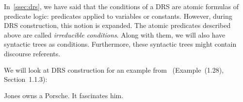\vspace{6mm}


\vspace{6mm}

In~\ref{ssec:drs}, we have said that the conditions of a DRS are atomic
formulas of predicate logic: predicates applied to variables or
constants. However, during DRS construction, this notion is expanded. The
atomic predicates described above are called \emph{irreducible
  conditions}. Along with them, we will also have syntactic trees as
conditions. Furthermore, these syntactic trees might contain discourse
referents.

We will look at DRS construction for an example
from~\cite{kamp1993discourse} (Example~(1.28), Section~1.1.3):

\begin{exe}
  \ex \label{ex:jones-porsche} Jones owns a Porsche. It fascinates him.
\end{exe}

